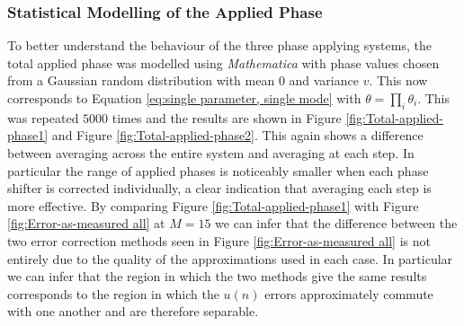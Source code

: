\documentclass[aps,pra,twocolumn,superscriptaddress,numerical]{revtex4-1}
\begin{document}
		
		\subsubsection{Statistical Modelling of the Applied Phase\label{Statistical Modelling of the Applied Phase}}
		
		To better understand the behaviour of the three phase applying systems, the total applied phase was modelled using \textit{Mathematica} with phase values chosen from a Gaussian random distribution with mean $0$ and variance $v$. This now corresponds to Equation \ref{eq:single parameter, single mode} with $\theta=\prod_{i}\theta_{i}$. This was repeated $5000$ times and the results are shown in Figure \ref{fig:Total-applied-phase1} and Figure \ref{fig:Total-applied-phase2}. This again shows a difference between averaging across the entire system and averaging at each step. In particular the range of applied phases is noticeably smaller when each phase shifter is corrected individually, a clear indication that averaging each step is more effective. By comparing Figure \ref{fig:Total-applied-phase1} with Figure \ref{fig:Error-as-measured all} at $M=15$ we can infer that the difference between the two error correction methods seen in Figure \ref{fig:Error-as-measured all} is not entirely due to the quality of the approximations used in each case. In particular we can infer that the region in which the two methods give the same results corresponds to the region in which the $u(n)$ errors approximately commute with one another and are therefore separable.
		
\end{document}

